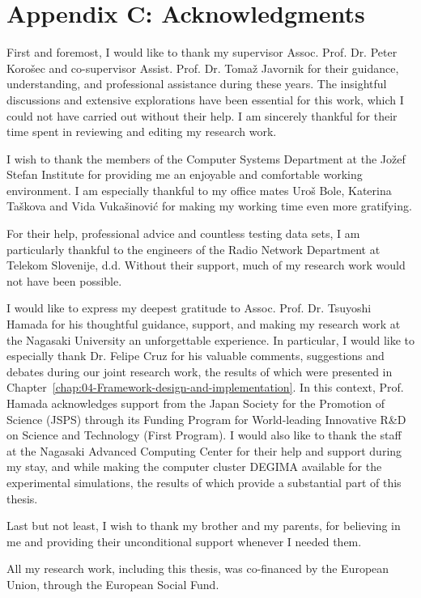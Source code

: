 
\chapter*{{\Large{\vspace{-2.3cm}Appendix C: Acknowledgments}}}

\noindent {}
\fancyhead[LO]{}

\noindent %

\noindent First and foremost, I would like to thank my supervisor
Assoc. Prof. Dr. Peter Koro\v{s}ec and co-supervisor Assist. Prof.
Dr. Toma\v{z} Javornik for their guidance, understanding, and professional
assistance during these years. The insightful discussions and extensive
explorations have been essential for this work, which I could not
have carried out without their help. I am sincerely thankful for their
time spent in reviewing and editing my research work.

I wish to thank the members of the Computer Systems Department at
the Jo\v{z}ef Stefan Institute for providing me an enjoyable and
comfortable working environment. I am especially thankful to my office
mates Uro\v{s} Bole, Katerina Ta\v{s}kova and Vida Vuka\v{s}inovi\'{c}
for making my working time even more gratifying.

For their help, professional advice and countless testing data sets,
I am particularly thankful to the engineers of the Radio Network Department
at Telekom Slovenije, d.d. Without their support, much of my research
work would not have been possible.

I would like to express my deepest gratitude to Assoc. Prof. Dr. Tsuyoshi
Hamada for his thoughtful guidance, support, and making my research
work at the Nagasaki University an unforgettable experience. In particular,
I would like to especially thank Dr. Felipe Cruz for his valuable
comments, suggestions and debates during our joint research work,
the results of which were presented in Chapter~\ref{chap:04-Framework-design-and-implementation}.
In this context, Prof. Hamada acknowledges support from the Japan
Society for the Promotion of Science (JSPS) through its Funding Program
for World-leading Innovative R\&D on Science and Technology (First
Program). I would also like to thank the staff at the Nagasaki Advanced
Computing Center for their help and support during my stay, and while
making the computer cluster DEGIMA available for the experimental
simulations, the results of which provide a substantial part of this
thesis.

Last but not least, I wish to thank my brother and my parents, for
believing in me and providing their unconditional support whenever
I needed them.

All my research work, including this thesis, was co-financed by the
European Union, through the European Social Fund.
